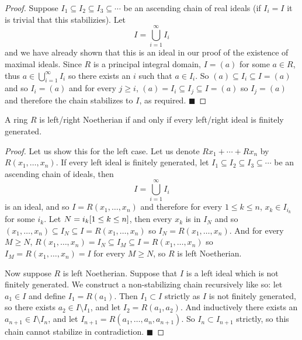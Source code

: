 \documentclass[10pt]{article}
\def\qed{\hskip1cm\hbox{}\hfill$\blacksquare$}
\begin{document}
\begin{proof}

    Suppose $I_1\subseteq I_2\subseteq I_3\subseteq\cdots$ be an ascending chain of real ideals (if $I_i=I$ it is trivial that this stabilizies).
    Let
    \[ I = \bigcup_{i=1}^\infty I_i \]
    and we have already shown that this is an ideal in our proof of the existence of maximal ideals.
    Since $R$ is a principal integral domain, $I=(a)$ for some $a\in R$, thus $a\in\bigcup_{i=1}^\infty I_i$ so there exists an $i$ such that $a\in I_i$.
    So $(a)\subseteq I_i\subseteq I=(a)$ and so $I_i=(a)$ and for every $j\geq i$, $(a)=I_i\subseteq I_j\subseteq I=(a)$ so $I_j=(a)$ and therefore the chain stabilizes to $I$, as required.
    \qed

\end{proof}

\begin{prop*}

    A ring $R$ is left/right Noetherian if and only if every left/right ideal is finitely generated.

\end{prop*}

\begin{proof}

    Let us show this for the left case.
    Let us denote $Rx_1+\cdots+Rx_n$ by $R(x_1,\dots,x_n)$.
    If every left ideal is finitely generated, let $I_1\subseteq I_2\subseteq I_3\subseteq\cdots$ be an ascending chain of ideals, then
    \[ I = \bigcup_{i=1}^\infty I_i \]
    is an ideal, and so $I=R(x_1,\dots,x_n)$ and therefore for every $1\leq k\leq n$, $x_k\in I_{i_k}$ for some $i_k$.
    Let $N=\maxof{i_k}[1\leq k\leq n]$, then every $x_k$ is in $I_N$ and so $(x_1,\dots,x_n)\subseteq I_N\subseteq I=R(x_1,\dots,x_n)$ so $I_N=R(x_1,\dots,x_n)$.
    And for every $M\geq N$, $R(x_1,\dots,x_n)=I_N\subseteq I_M\subseteq I=R(x_1,\dots,x_n)$ so $I_M=R(x_1,\dots,x_n)=I$ for every $M\geq N$, so $R$ is left Noetherian.

    Now suppose $R$ is left Noetherian.
    Suppose that $I$ is a left ideal which is not finitely generated.
    We construct a non-stabilizing chain recursively like so: let $a_1\in I$ and define $I_1=R(a_1)$.
    Then $I_1\subset I$ strictly as $I$ is not finitely generated, so there exists $a_2\in I\setminus I_1$, and let $I_2=R(a_1,a_2)$.
    And inductively there exists an $a_{n+1}\in I\setminus I_n$, and let $I_{n+1}=R(a_1,\dots,a_n,a_{n+1})$.
    So $I_n\subset I_{n+1}$ strictly, so this chain cannot stabilize in contradiction.
    \qed

\end{proof}
\end{document}
